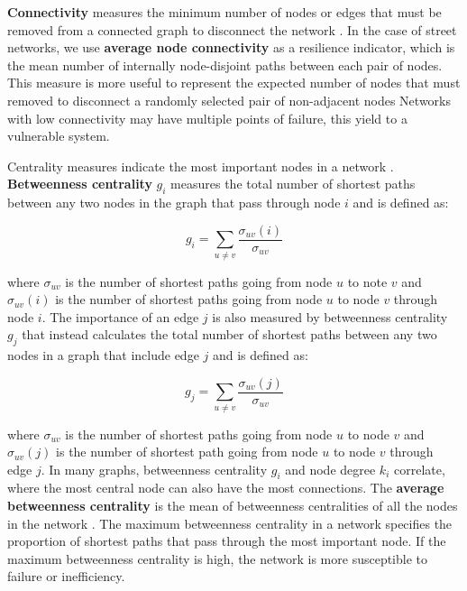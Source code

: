 \textbf{Connectivity} measures the minimum number of nodes or edges that must be removed from a connected graph to disconnect the network \cite{urban-keitt_2001}. In the case of street networks, we use \textbf{average node connectivity} as a resilience indicator, which is the mean number of internally node-disjoint paths between each pair of nodes. This measure is more useful to represent the expected number of nodes that must removed to disconnect a randomly selected pair of non-adjacent nodes \cite{beineke-oellermann-pippert_2002, dankelmann-oellermann_2003} Networks with low connectivity may have multiple points of failure, this yield to a vulnerable system. 

Centrality measures indicate the most important nodes in a network \cite{huang_2016, zhong_2017}. \textbf{Betweenness centrality} $g_i$ measures the total number of shortest paths between any two nodes in the graph that pass through node $i$ \cite{freeman_1997, ermagun-levinson_2017} and is defined as:

\begin{equation} \label{eq:6}
g_i = \sum_{u \neq v} \frac{\sigma_{uv} (i)}{\sigma_{uv}}
\end{equation}

where $\sigma_{uv}$ is the number of shortest paths going from node $u$ to note $v$ and $\sigma_{uv}(i)$ is the number of shortest paths going from node $u$ to node $v$ through node $i$. The importance of an edge $j$ is also measured by betweenness centrality $g_j$ that instead calculates the total number of shortest paths between any two nodes in a graph that include edge $j$ \cite{newman_2003} and is defined as:

\begin{equation} \label{eq:7}
g_j = \sum_{u \neq v} \frac{\sigma_{uv} (j)}{\sigma_{uv}}
\end{equation}

where $\sigma_{uv}$ is the number of shortest paths going from node $u$ to node $v$ and $\sigma_{uv}(j)$ is the number of shortest path going from node $u$ to node $v$ through edge $j$. In many graphs, betweenness centrality $g_i$ and node degree $k_i$ correlate, where the most central node can also have the most connections. The \textbf{average betweenness centrality} is the mean of betweenness centralities of all the nodes in the network \cite{barthelemy_spatial_2011}. The maximum betweenness centrality in a network specifies the proportion of shortest paths that pass through the most important node. If the maximum betweenness centrality is high, the network is more susceptible to failure or inefficiency.

